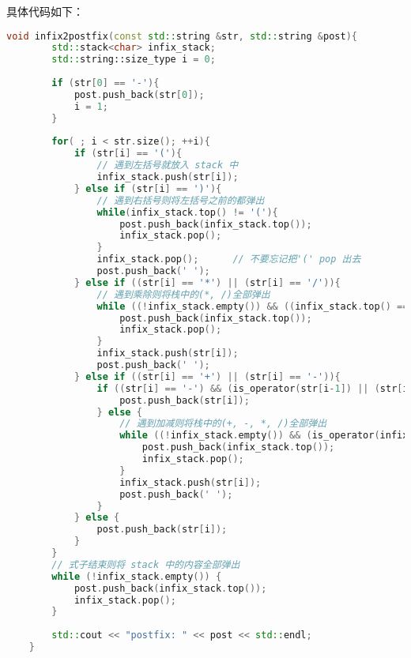 \documentclass[UTF8]{ctexart}
\begin{document}
具体代码如下：
\begin{lstlisting}[language=c++, breaklines=true, keywordstyle=\color{blue!70}, commentstyle=\color{red!50!green!50!blue!50}, frame=shadowbox, rulesepcolor=\color{red!20!green!20!blue!20}]
    void infix2postfix(const std::string &str, std::string &post){
        std::stack<char> infix_stack;
        std::string::size_type i = 0; 
    
        if (str[0] == '-'){
            post.push_back(str[0]);
            i = 1; 
        }
    
        for( ; i < str.size(); ++i){
            if (str[i] == '('){ 
                // 遇到左括号就放入 stack 中
                infix_stack.push(str[i]);
            } else if (str[i] == ')'){    
                // 遇到右括号则将左括号之前的都弹出
                while(infix_stack.top() != '('){
                    post.push_back(infix_stack.top()); 
                    infix_stack.pop();
                }
                infix_stack.pop();      // 不要忘记把'(' pop 出去
                post.push_back(' ');
            } else if ((str[i] == '*') || (str[i] == '/')){
                // 遇到乘除则将栈中的(*, /)全部弹出
                while ((!infix_stack.empty()) && ((infix_stack.top() == '*') || (infix_stack.top() == '/'))){
                    post.push_back(infix_stack.top());
                    infix_stack.pop();
                }
                infix_stack.push(str[i]);
                post.push_back(' ');
            } else if ((str[i] == '+') || (str[i] == '-')){
                if ((str[i] == '-') && (is_operator(str[i-1]) || (str[i-1] == '(') || (str[i-1] == 'e') || (str[i-1] == 'E'))){
                    post.push_back(str[i]);
                } else {
                    // 遇到加减则将栈中的(+, -, *, /)全部弹出
                    while ((!infix_stack.empty()) && (is_operator(infix_stack.top()))){
                        post.push_back(infix_stack.top());
                        infix_stack.pop();
                    }
                    infix_stack.push(str[i]);
                    post.push_back(' ');
                }
            } else {
                post.push_back(str[i]);
            }
        }
        // 式子结束则将 stack 中的内容全部弹出
        while (!infix_stack.empty()) {
            post.push_back(infix_stack.top()); 
            infix_stack.pop();
        }
        
        std::cout << "postfix: " << post << std::endl;
    }    
\end{lstlisting}
\end{document}
